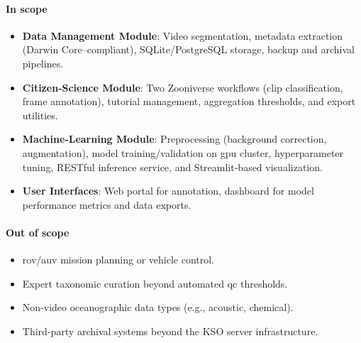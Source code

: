 \paragraph{In scope}
\begin{itemize}
  \item \textbf{Data Management Module}: Video segmentation, metadata extraction (Darwin Core–compliant), SQLite/PostgreSQL storage, backup and archival pipelines.
  \item \textbf{Citizen‐Science Module}: Two Zooniverse workflows (clip classification, frame annotation), tutorial management, aggregation thresholds, and export utilities.
  \item \textbf{Machine‐Learning Module}: Preprocessing (background correction, augmentation), model training/validation on \gls{gpu} cluster, hyperparameter tuning, RESTful inference service, and Streamlit‐based visualization.
  \item \textbf{User Interfaces}: Web portal for annotation, dashboard for model performance metrics and data exports.
\end{itemize}
\paragraph{Out of scope}
\begin{itemize}
  \item \gls{rov}/\gls{auv} mission planning or vehicle control.
  \item Expert taxonomic curation beyond automated \gls{qc} thresholds.
  \item Non-video oceanographic data types (e.g., acoustic, chemical).
  \item Third‐party archival systems beyond the KSO server infrastructure.
\end{itemize}

